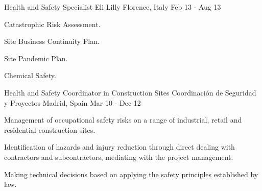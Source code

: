 \begin{cventries}
\cventry
    {Health and Safety Specialist} %
    {Eli Lilly} %
    {Florence, Italy} %
    {Feb 13 - Aug 13} %
    {
        \begin{cvitems} %
            \item {Catastrophic Risk Assessment.}
            \item {Site Business Continuity Plan.}
            \item {Site Pandemic Plan.}
            \item {Chemical Safety.}
        \end{cvitems}
    }

\cventry
    {Health and Safety Coordinator in Construction Sites} %
    {Coordinación de Seguridad y Proyectos} %
    {Madrid, Spain} %
    {Mar 10 - Dec 12} %
    {
        \begin{cvitems} %
            \item {Management of occupational safety risks on a range of industrial, retail and residential construction sites.}
            \item {Identification of hazards and injury reduction through direct dealing with contractors and subcontractors, mediating with the project management.}
            \item {Making technical decisions based on applying the safety principles established by law.}
        \end{cvitems}
    }

\end{cventries}

